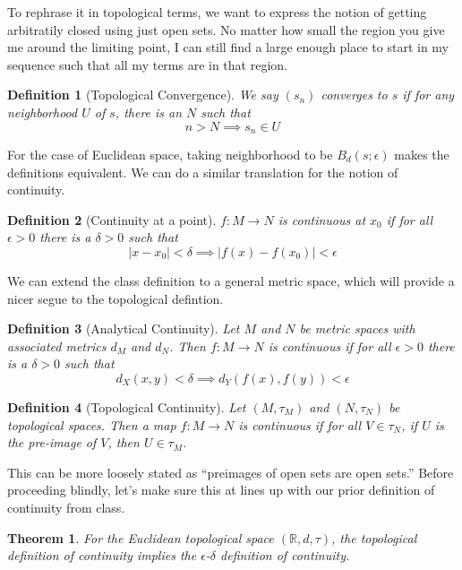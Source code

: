 \documentclass{article}
\newtheorem*{thm}{Theorem}
\newtheorem*{defn}{Definition}
\begin{document}
To rephrase it in topological terms, we want to express the notion of getting
arbitratily closed using just open sets. No matter how small the region you give
me around the limiting point, I can still find a large enough place to start in
my sequence such that all my terms are in that region.
\begin{defn}[Topological Convergence]
    We say $(s_n)$ converges to $s$ if for any neighborhood $U$ of $s$, there is an
    $N$ such that $$n>N \implies s_n \in U$$
\end{defn}

For the case of Euclidean space, taking neighborhood to be $B_d(s;\epsilon)$
makes the definitions equivalent. We can do a similar translation for the
notion of continuity.

\begin{defn}[Continuity at a point]
    $f: M \rightarrow N$ is continuous at $x_0$ if for all $\epsilon > 0$ there
    is a $\delta > 0$ such that $$\mid x-x_0 \mid < \delta \implies 
    \mid f(x)-f(x_0) \mid  < \epsilon$$
\end{defn}

We can extend the class definition to a general metric space, which will provide
a nicer segue to the topological defintion.

\begin{defn}[Analytical Continuity]
    Let $M$ and $N$ be metric spaces with associated metrics $d_M$ and $d_N$.
    Then $f: M \rightarrow N$ is continuous if for all $\epsilon > 0$ there is a
    $\delta > 0$ such that $$d_X(x, y) < \delta \implies d_Y(f(x), f(y)) <
    \epsilon$$
\end{defn}

\begin{defn}[Topological Continuity]
    Let $(M, \tau_M)$ and $(N, \tau_N)$ be topological spaces. Then a map $f: M
    \rightarrow N$ is continuous if for all $V \in \tau_N$, if $U$ is the
    pre-image of $V$, then $U \in \tau_M$.
\end{defn}

This can be more loosely stated as ``preimages of open sets are open
sets.'' Before proceeding blindly, let's make sure this at lines up with
our prior definition of continuity from class.

\begin{thm}
    For the Euclidean topological space $(\mathbb{R}, d, \tau)$, the topological
    definition of continuity implies the  $\epsilon$-$\delta$
    definition of continuity.
\end{thm}
\end{document}
